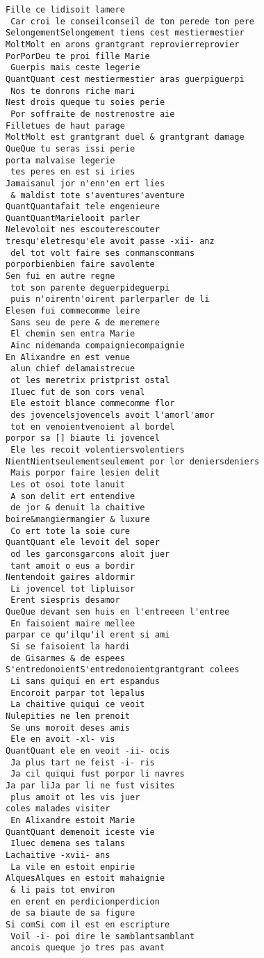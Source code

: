 \documentclass[
  letterpaper,
  DIV=11,
  numbers=noendperiod]{scrreprt}
\begin{document}
\begin{verbatim}
Fille ce lidisoit lamere
 Car croi le conseilconseil de ton perede ton pere
SelongementSelongement tiens cest mestiermestier
MoltMolt en arons grantgrant reprovierreprovier
PorPorDeu te proi fille Marie
 Guerpis mais ceste legerie
QuantQuant cest mestiermestier aras guerpiguerpi
 Nos te donrons riche mari
Nest drois queque tu soies perie
 Por soffraite de nostrenostre aie
Filletues de haut parage
MoltMolt est grantgrant duel & grantgrant damage
QueQue tu seras issi perie
porta malvaise legerie
 tes peres en est si iries
Jamaisanul jor n'enn'en ert lies
 & maldist tote s'aventures'aventure
QuantQuantafait tele engenieure
QuantQuantMarielooit parler
Nelevoloit nes escouterescouter
tresqu'eletresqu'ele avoit passe -xii- anz
 del tot volt faire ses conmansconmans
porporbienbien faire savolente
Sen fui en autre regne
 tot son parente deguerpideguerpi
 puis n'oirentn'oirent parlerparler de li
Elesen fui commecomme leire
 Sans seu de pere & de meremere
 El chemin sen entra Marie
 Ainc nidemanda compaigniecompaignie
En Alixandre en est venue
 alun chief delamaistrecue
 ot les meretrix pristprist ostal
 Iluec fut de son cors venal
 Ele estoit blance commecomme flor
 des jovencelsjovencels avoit l'amorl'amor
 tot en venoientvenoient al bordel
porpor sa [] biaute li jovencel
 Ele les recoit volentiersvolentiers
NientNientseulementseulement por lor deniersdeniers
 Mais porpor faire lesien delit
 Les ot osoi tote lanuit
 A son delit ert entendive
 de jor & denuit la chaitive
boire&mangiermangier & luxure
 Co ert tote la soie cure
QuantQuant ele levoit del soper
 od les garconsgarcons aloit juer
 tant amoit o eus a bordir
Nentendoit gaires aldormir
 Li jovencel tot lipluisor
 Erent siespris desamor
QueQue devant sen huis en l'entreeen l'entree
 En faisoient maire mellee
parpar ce qu'ilqu'il erent si ami
 Si se faisoient la hardi
 de Gisarmes & de espees
S'entredonoientS'entredonoientgrantgrant colees
 Li sans quiqui en ert espandus
 Encoroit parpar tot lepalus
 La chaitive quiqui ce veoit
Nulepities ne len prenoit
 Se uns moroit deses amis
 Ele en avoit -xl- vis
QuantQuant ele en veoit -ii- ocis
 Ja plus tart ne feist -i- ris
 Ja cil quiqui fust porpor li navres
Ja par liJa par li ne fust visites
 plus amoit ot les vis juer
coles malades visiter
 En Alixandre estoit Marie
QuantQuant demenoit iceste vie
 Iluec demena ses talans
Lachaitive -xvii- ans
 La vile en estoit enpirie
AlquesAlques en estoit mahaignie
 & li pais tot environ
 en erent en perdicionperdicion
 de sa biaute de sa figure
Si comSi com il est en escripture
 Voil -i- poi dire le samblantsamblant
 ancois queque jo tres pas avant

\end{verbatim}
\end{document}
